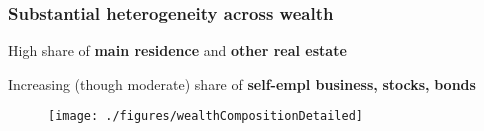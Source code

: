 \documentclass[pdflatex,aspectratio=169]{beamer}
\begin{document}
\begin{frame}\frametitle{\bf Substantial heterogeneity across wealth \hypertarget{WealthSim}{}}

\bi
\item High share of \textbf{\color{ao}main residence} and \textbf{\color{capri} other real estate}
\item Increasing (though moderate) share of \textbf{\color{amber} self-empl business,} \textbf{\color{red} stocks,} \textbf{\color{jgreen} bonds}
\ei
{}
\vspace*{-2.5mm}
\begin{figure}
\begin{center}
\texttt{[image: ./figures/wealthCompositionDetailed]} %
\end{center}
\end{figure}
\end{frame}









\begin{comment}
\begin{frame}\frametitle{\bf\normalsize Popular hypothesis: Asset purchases boost wealth inequality }
\bi
\item \dots because holdings of financial assets heavily skewed toward rich Hhs\\[9.5mm]
\begin{figure}
\begin{center}
\texttt{[image: ./figures/fAssetParticipationByIncome\_sub]}
\end{center}
\end{figure}
\ei

\end{frame}


\begin{frame}\frametitle{\bf\normalsize Popular hypothesis: Asset purchases boost wealth inequality }
\bi
\item<1-> But what about effects of APP on house prices?
\item<2-> And what about employment effects / income inequality?
\item<2-> Little quantitative evidence in general
\begin{figure}
\begin{center}
\texttt{[image: ./figures/fAssetParticipationByIncome]}
\end{center}
\end{figure}
\ei

\end{frame}

\end{comment}
\end{document}
